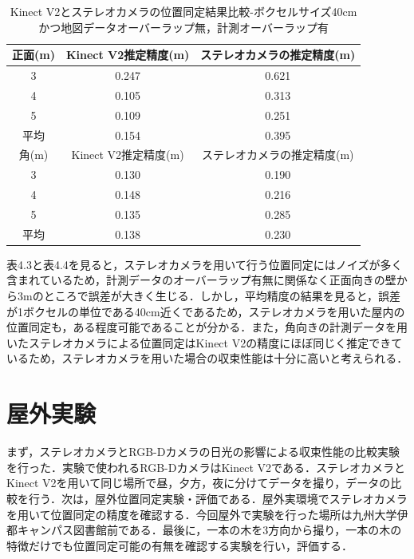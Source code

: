 \begin{table}[htbp]
\begin{center}
\begin{tabular}{|c|c|c|} \hline
正面(m) & Kinect V2推定精度(m) & ステレオカメラの推定精度(m)\\ \hline
3 & 0.247 & 0.621 \\ \hline
4 & 0.105 & 0.313 \\ \hline
5 & 0.109 & 0.251 \\ \hline
平均 & 0.154 & 0.395 \\ \hline\hline
角(m) & Kinect V2推定精度(m) & ステレオカメラの推定精度(m)\\ \hline
3 & 0.130 & 0.190 \\ \hline
4 & 0.148 & 0.216 \\ \hline
5 & 0.135 & 0.285 \\ \hline
平均 & 0.138 & 0.230 \\ \hline
\end{tabular}
\caption{Kinect V2とステレオカメラの位置同定結果比較-ボクセルサイズ40cmかつ地図データオーバーラップ無，計測オーバーラップ有}
\end{center}
\end{table}

\newpage

表4.3と表4.4を見ると，ステレオカメラを用いて行う位置同定にはノイズが多く含まれているため，計測データのオーバーラップ有無に関係なく正面向きの壁から3mのところで誤差が大きく生じる．しかし，平均精度の結果を見ると，誤差が1ボクセルの単位である40cm近くであるため，ステレオカメラを用いた屋内の位置同定も，ある程度可能であることが分かる．また，角向きの計測データを用いたステレオカメラによる位置同定はKinect V2の精度にほぼ同じく推定できているため，ステレオカメラを用いた場合の収束性能は十分に高いと考えられる．
\newpage

\section{屋外実験}
まず，ステレオカメラとRGB-Dカメラの日光の影響による収束性能の比較実験を行った．実験で使われるRGB-DカメラはKinect V2である．ステレオカメラとKinect V2を用いて同じ場所で昼，夕方，夜に分けてデータを撮り，データの比較を行う．次は，屋外位置同定実験・評価である．屋外実環境でステレオカメラを用いて位置同定の精度を確認する．今回屋外で実験を行った場所は九州大学伊都キャンパス図書館前である．最後に，一本の木を3方向から撮り，一本の木の特徴だけでも位置同定可能の有無を確認する実験を行い，評価する．
